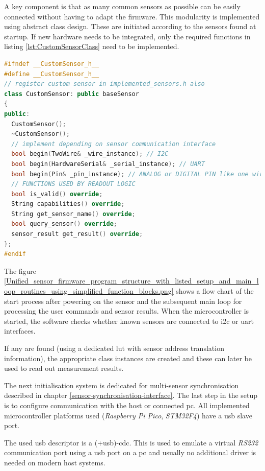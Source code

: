 A key component is that as many common sensors as possible can be easily
connected without having to adapt the firmware. This modularity is
implemented using abstract class design. These are initiated according
to the sensors found at startup. If new hardware needs to be integrated,
only the required functions in listing \ref{lst:CustomSensorClass} need
to be implemented.

\begin{lstlisting}[language={C++}, caption={CustomSensor-Class for adding new sensor hardware support into the unified sensor firmware package}, label=lst:CustomSensorClass]
#ifndef __CustomSensor_h__
#define __CustomSensor_h__
// register custom sensor in implemented_sensors.h also
class CustomSensor: public baseSensor
{
public:
  CustomSensor();
  ~CustomSensor();
  // implement depending on sensor communication interface
  bool begin(TwoWire& _wire_instance); // I2C
  bool begin(HardwareSerial& _serial_instance); // UART
  bool begin(Pin& _pin_instance); // ANALOG or DIGITAL PIN like one wire
  // FUNCTIONS USED BY READOUT LOGIC
  bool is_valid() override;
  String capabilities() override;
  String get_sensor_name() override;
  bool query_sensor() override;
  sensor_result get_result() override;
};
#endif
\end{lstlisting}

The figure
\ref{Unified_sensor_firmware_program_structure_with_listed_setup_and_main_loop_routines_using_simplified_function_blocks.png}
shows a flow chart of the start process after powering on the sensor and
the subsequent main loop for processing the user commands and sensor
results. When the microcontroller is started, the software checks
whether known sensors are connected to \gls{i2c} or \gls{uart}
interfaces.

If any are found (using a dedicated \gls{lut} with sensor address
translation information), the appropriate class instances are created
and these can later be used to read out measurement results.

The next initialisation system is dedicated for multi-sensor
synchronisation described in chapter
\ref{sensor-synchronisation-interface}. The last step in the setup is to
configure communication with the host or connected \gls{pc}. All
implemented microcontroller platforms used (\emph{Raspberry Pi Pico},
\emph{STM32F4}) have a \gls{usb} slave port.

The used usb descriptor is a (+usb)-\gls{cdc}. This is used to emulate a
virtual \emph{RS232} communication port using a \gls{usb} port on a
\gls{pc} and usually no additional driver is needed on modern host
systems.

